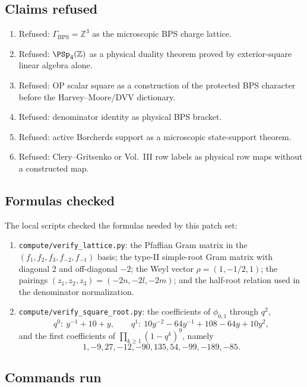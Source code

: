 \subsection{Claims refused}

\begin{enumerate}
\item Refused: \(\Gamma_{\mathrm{BPS}}=\mathbb Z^3\) as the microscopic
BPS charge lattice.
\item Refused: \(\PSp_4(\mathbb Z)\) as a physical duality theorem proved
by exterior-square linear algebra alone.
\item Refused: OP scalar square as a construction of the protected BPS
character before the Harvey--Moore/DVV dictionary.
\item Refused: denominator identity as physical BPS bracket.
\item Refused: active Borcherds support as a microscopic state-support
theorem.
\item Refused: Clery--Gritsenko or Vol.~III row labels as physical row
maps without a constructed map.
\end{enumerate}

\subsection{Formulas checked}

The local scripts checked the formulas needed by this patch set:
\begin{enumerate}
\item \texttt{compute/verify\_lattice.py}: the Pfaffian Gram matrix in
the \((f_1,f_2,f_3,f_{-2},f_{-1})\) basis; the type-II simple-root Gram
matrix with diagonal \(2\) and off-diagonal \(-2\); the Weyl vector
\(\rho=(1,-1/2,1)\); the pairings
\((z_1,z_2,z_3)=(-2n,-2l,-2m)\); and the half-root relation used in the
denominator normalization.
\item \texttt{compute/verify\_square\_root.py}: the coefficients of
\(\phi_{0,1}\) through \(q^2\),
\[
q^0:\ y^{-1}+10+y,\qquad
q^1:\ 10y^{-2}-64y^{-1}+108-64y+10y^2,
\]
and the first coefficients of \(\prod_{k\ge1}(1-q^k)^{9}\), namely
\[
1,-9,27,-12,-90,135,54,-99,-189,-85.
\]
\end{enumerate}

\subsection{Commands run}


